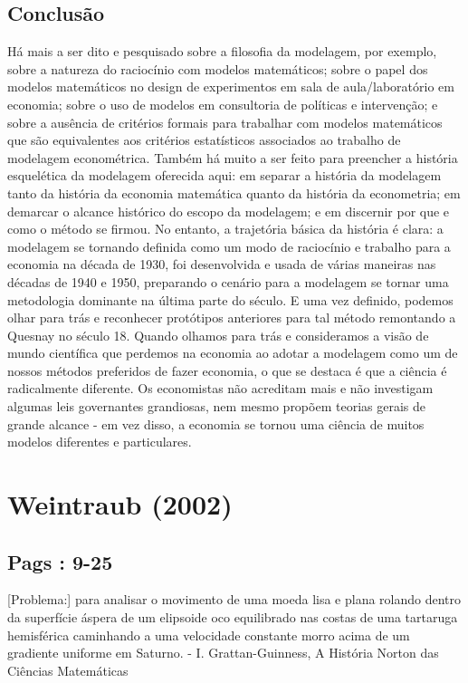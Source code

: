 \documentclass[a4paper,12pt]{article}[abntex2]
\begin{document}
\subsection{\textbf{Conclusão}}
Há mais a ser dito e pesquisado sobre a filosofia da modelagem, por exemplo, sobre a natureza do raciocínio com modelos matemáticos; sobre o papel dos modelos matemáticos no design de experimentos em sala de aula/laboratório em economia; sobre o uso de modelos em consultoria de políticas e intervenção; e sobre a ausência de critérios formais para trabalhar com modelos matemáticos que são equivalentes aos critérios estatísticos associados ao trabalho de modelagem econométrica. Também há muito a ser feito para preencher a história esquelética da modelagem oferecida aqui: em separar a história da modelagem tanto da história da economia matemática quanto da história da econometria; em demarcar o alcance histórico do escopo da modelagem; e em discernir por que e como o método se firmou. No entanto, a trajetória básica da história é clara: a modelagem se tornando definida como um modo de raciocínio e trabalho para a economia na década de 1930, foi desenvolvida e usada de várias maneiras nas décadas de 1940 e 1950, preparando o cenário para a modelagem se tornar uma metodologia dominante na última parte do século. E uma vez definido, podemos olhar para trás e reconhecer protótipos anteriores para tal método remontando a Quesnay no século 18. Quando olhamos para trás e consideramos a visão de mundo científica que perdemos na economia ao adotar a modelagem como um de nossos métodos preferidos de fazer economia, o que se destaca é que a ciência é radicalmente diferente. Os economistas não acreditam mais e não investigam algumas leis governantes grandiosas, nem mesmo propõem teorias gerais de grande alcance - em vez disso, a economia se tornou uma ciência de muitos modelos diferentes e particulares.

\section{\textbf{Weintraub (2002)}}
\subsection{\textbf{Pags : 9-25}}
[Problema:] para analisar o movimento de uma moeda lisa e plana rolando dentro da superfície áspera de um elipsoide oco equilibrado nas costas de uma tartaruga hemisférica caminhando a uma velocidade constante morro acima de um gradiente uniforme em Saturno.
- I. Grattan-Guinness, A História Norton das Ciências Matemáticas
\end{document}
